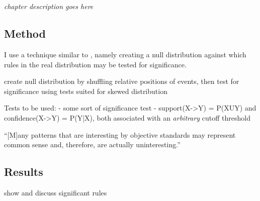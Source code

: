 
\chapter{\significance}
\label{ch:significance}
\emph{chapter description goes here}

\section{Method}
I use a technique similar to \citet{abuzhaya17}, namely creating a null distribution against which rules in the real distribution may be tested for significance.

create null distribution by shuffling relative positions of events, then test for significance using tests suited for skewed distribution

Tests to be used:
- some sort of significance test
- support(X->Y) = P(XUY) and confidence(X->Y) = P(Y|X), both associated with an \emph{arbitrary} cutoff threshold \citep[]{han12}

``[M]any patterns that are interesting by objective standards may represent common sense and, therefore, are actually uninteresting.'' \citep[]{han12}
\section{Results}
show and discuss significant rules